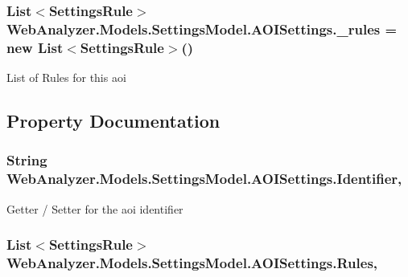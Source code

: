 \subsubsection[{\+\_\+rules}]{\setlength{\rightskip}{0pt plus 5cm}List$<${\bf Settings\+Rule}$>$ Web\+Analyzer.\+Models.\+Settings\+Model.\+A\+O\+I\+Settings.\+\_\+rules = new List$<${\bf Settings\+Rule}$>$()\hspace{0.3cm}{\ttfamily [private]}}\label{class_web_analyzer_1_1_models_1_1_settings_model_1_1_a_o_i_settings_a36ff6cc7414c41d4b619b3101977ff4c}


List of Rules for this aoi 



\subsection{Property Documentation}
\hypertarget{class_web_analyzer_1_1_models_1_1_settings_model_1_1_a_o_i_settings_a6fee5ecaba688289bfd5795367250339}{}
\subsubsection[{Identifier}]{\setlength{\rightskip}{0pt plus 5cm}String Web\+Analyzer.\+Models.\+Settings\+Model.\+A\+O\+I\+Settings.\+Identifier\hspace{0.3cm}{\ttfamily [get]}, {\ttfamily [set]}}\label{class_web_analyzer_1_1_models_1_1_settings_model_1_1_a_o_i_settings_a6fee5ecaba688289bfd5795367250339}


Getter / Setter for the aoi identifier 

\hypertarget{class_web_analyzer_1_1_models_1_1_settings_model_1_1_a_o_i_settings_a8852191a79accfc1288d0fb6a2b4a14c}{}
\subsubsection[{Rules}]{\setlength{\rightskip}{0pt plus 5cm}List$<${\bf Settings\+Rule}$>$ Web\+Analyzer.\+Models.\+Settings\+Model.\+A\+O\+I\+Settings.\+Rules\hspace{0.3cm}{\ttfamily [get]}, {\ttfamily [set]}}\label{class_web_analyzer_1_1_models_1_1_settings_model_1_1_a_o_i_settings_a8852191a79accfc1288d0fb6a2b4a14c}


